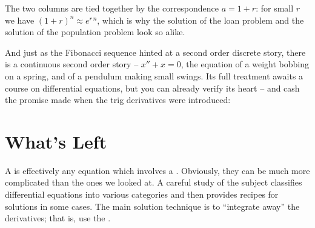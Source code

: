 \bigskip
\centerline{\vbox{}}
\bigskip

The two columns are tied together by the correspondence $a = 1 + r$: for small
$r$ we have $(1+r)^n \approx e^{r\,n}$, which is why the solution of the loan
problem and the solution of the population problem look so alike.


And just as the Fibonacci sequence hinted at a second order discrete story,
there is a continuous second order story -- $x'' + x = 0$, the equation of a
weight bobbing on a spring, and of a pendulum making small swings. Its full treatment awaits a course on differential
equations, but you can already verify its heart -- and cash the promise made
when the trig derivatives were introduced:


\section{What's Left}
A  is effectively any equation which involves a . Obviously, they can
be much more complicated than the ones we looked at. A careful study of the subject classifies 
differential equations into various categories and then provides recipes for solutions in some cases. 
The main solution technique is to
``integrate away'' the derivatives; that is, use the .
